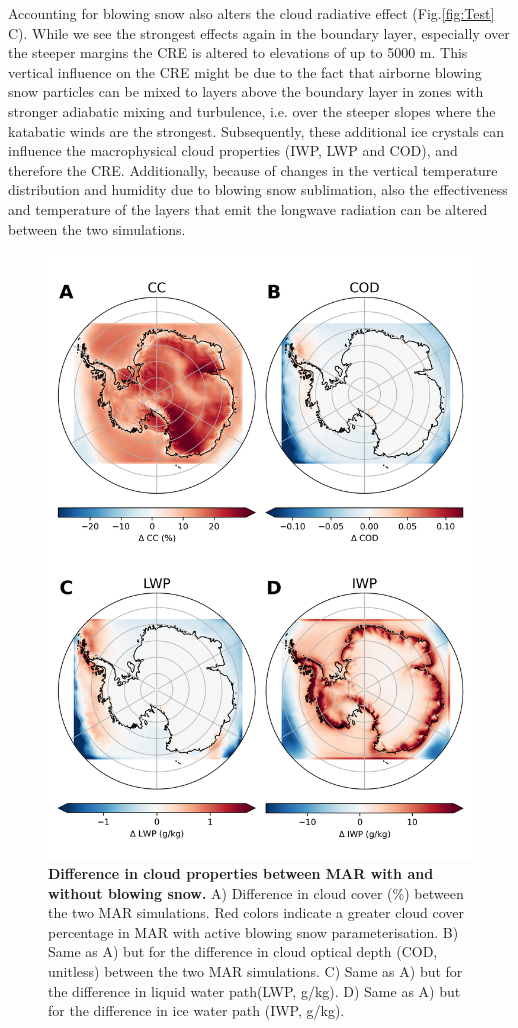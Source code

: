 \documentclass[12pt]{article}
\begin{document}
Accounting for blowing snow also alters the cloud radiative effect (Fig.\ref{fig:Test} C). While we see the strongest effects again in the boundary layer, especially over the steeper margins the CRE is altered to elevations of up to 5000 m. This vertical influence on the CRE might be due to the fact that airborne blowing snow particles can be mixed to layers above the boundary layer in zones with stronger adiabatic mixing and turbulence, i.e. over the steeper slopes where the katabatic winds are the strongest. Subsequently, these additional ice crystals can influence the macrophysical cloud properties (IWP, LWP and COD), and therefore the CRE. Additionally, because of changes in the vertical temperature distribution and humidity due to blowing snow sublimation, also the effectiveness and temperature of the layers that emit the longwave radiation can be altered between the two simulations. 
\begin{figure}[H]
	\includegraphics[scale=0.7,center]{microphysics.png}
	\caption{\textbf{Difference in cloud properties between MAR with and without blowing snow.} A) Difference in cloud cover (\%) between the two MAR simulations. Red colors indicate a greater cloud cover percentage in MAR with active blowing snow parameterisation. B) Same as A) but for the difference in cloud optical depth (COD, unitless) between the two MAR simulations. C) Same as A) but for the difference in liquid water path(LWP, g/kg). D) Same as A) but for the difference in ice water path (IWP, g/kg).}
	\label{fig:micro}
\end{figure}
\end{document}
